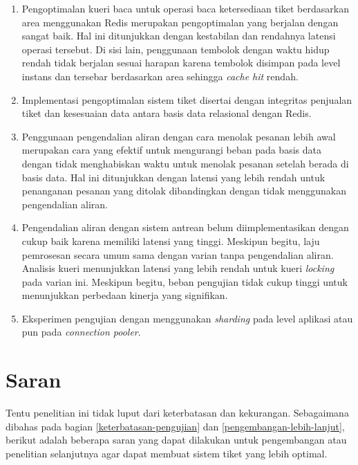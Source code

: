 \begin{enumerate}
    \item Pengoptimalan kueri baca untuk operasi baca ketersediaan tiket berdasarkan area menggunakan Redis merupakan pengoptimalan yang berjalan dengan sangat baik. Hal ini ditunjukkan dengan kestabilan dan rendahnya latensi operasi tersebut. Di sisi lain, penggunaan tembolok dengan waktu hidup rendah tidak berjalan sesuai harapan karena tembolok disimpan pada level instans dan tersebar berdasarkan area sehingga \textit{cache hit} rendah.
    \item Implementasi pengoptimalan sistem tiket disertai dengan integritas penjualan tiket dan kesesuaian data antara basis data relasional dengan Redis.
    \item Penggunaan pengendalian aliran dengan cara menolak pesanan lebih awal merupakan cara yang efektif untuk mengurangi beban pada basis data dengan tidak menghabiskan waktu untuk menolak pesanan setelah berada di basis data. Hal ini ditunjukkan dengan latensi yang lebih rendah untuk penanganan pesanan yang ditolak dibandingkan dengan tidak menggunakan pengendalian aliran.
    \item Pengendalian aliran dengan sistem antrean belum diimplementasikan dengan cukup baik karena memiliki latensi yang tinggi. Meskipun begitu, laju pemrosesan secara umum sama dengan varian tanpa pengendalian aliran. Analisis kueri menunjukkan latensi yang lebih rendah untuk kueri \textit{locking} pada varian ini. Meskipun begitu, beban pengujian tidak cukup tinggi untuk menunjukkan perbedaan kinerja yang signifikan.
    \item Eksperimen pengujian dengan menggunakan \textit{sharding} pada level aplikasi atau pun pada \textit{connection pooler}.
\end{enumerate}

\pagebreak

\section{Saran}

Tentu penelitian ini tidak luput dari keterbatasan dan kekurangan. Sebagaimana dibahas pada bagian \ref{keterbatasan-pengujian} dan \ref{pengembangan-lebih-lanjut}, berikut adalah beberapa saran yang dapat dilakukan untuk pengembangan atau penelitian selanjutnya agar dapat membuat sistem tiket yang lebih optimal.

